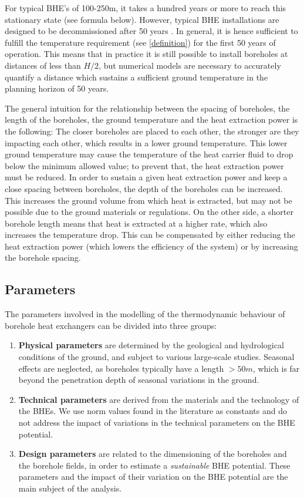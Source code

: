 For typical BHE's of 100-250m, it takes a hundred years or more to reach this stationary state (see formula below). However, typical BHE installations are designed to be decommissioned after 50 years \citep{sia_sondes_2010}. In general, it is hence sufficient to fulfill the temperature requirement (see \ref{definition}) for the first 50 years of operation. This means that in practice it is still possible to install boreholes at distances of less than $H/2$, but numerical models are necessary to accurately quantify a distance which sustains a sufficient ground temperature in the planning horizon of 50 years.

The general intuition for the relationship between the spacing of boreholes, the length of the boreholes, the ground temperature and the heat extraction power is the following:
The closer boreholes are placed to each other, the stronger are they impacting each other, which results in a lower ground temperature. 
This lower ground temperature may cause the temperature of the heat carrier fluid to drop below the minimum allowed value; to prevent that, the heat extraction power must be reduced. 
In order to sustain a given heat extraction power and keep a close spacing between boreholes, the depth of the boreholes can be increased. This increases the ground volume from which heat is extracted, but may not be possible due to the ground materials or regulations. 
On the other side, a shorter borehole length means that heat is extracted at a higher rate, which also increases the temperature drop. This can be compensated by either reducing the heat extraction power (which lowers the efficiency of the system) or by increasing the borehole spacing.

\subsection{Parameters}
\label{geo_params}
The parameters involved in the modelling of the thermodynamic behaviour of borehole heat exchangers can be divided into three groups: 

\begin{enumerate}
\item \textbf{Physical parameters} are determined by the geological and hydrological conditions of the ground, and subject to various large-scale studies. Seasonal effects are neglected, as boreholes typically have a length $> 50m$, which is far beyond the penetration depth of seasonal variations in the ground.

\item \textbf{Technical parameters} are derived from the materials and the technology of the BHEs. We use norm values found in the literature as constants and do not address the impact of variations in the technical parameters on the BHE potential.

\item \textbf{Design parameters} are related to the dimensioning of the boreholes and the borehole fields, in order to estimate a \textit{sustainable} BHE potential. These parameters and the impact of their variation on the BHE potential are the main subject of the analysis. 
\end{enumerate}

